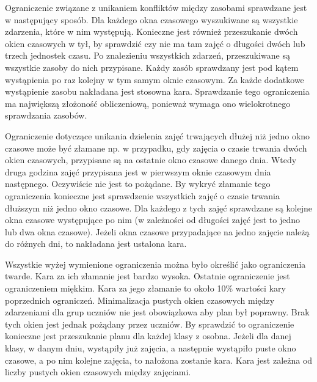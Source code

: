 Ograniczenie związane z unikaniem konfliktów między zasobami sprawdzane jest w następujący sposób. Dla każdego okna czasowego wyszukiwane są wszystkie zdarzenia, które w nim występują. Konieczne jest również przeszukanie dwóch okien czasowych w tył, by sprawdzić czy nie ma tam zajęć o długości dwóch lub trzech jednostek czasu. Po znalezieniu wszystkich zdarzeń, przeszukiwane są wszystkie zasoby do nich przypisane. Każdy zasób sprawdzany jest pod kątem wystąpienia po raz kolejny w tym samym oknie czasowym. Za każde dodatkowe wystąpienie zasobu nakładana jest stosowna kara. Sprawdzanie tego ograniczenia ma największą złożoność obliczeniową, ponieważ wymaga ono wielokrotnego sprawdzania zasobów.

Ograniczenie dotyczące unikania dzielenia zajęć trwających dłużej niż jedno okno czasowe może być złamane np. w przypadku, gdy zajęcia o czasie trwania dwóch okien czasowych, przypisane są na ostatnie okno czasowe danego dnia. Wtedy druga godzina zajęć przypisana jest w pierwszym oknie czasowym dnia następnego. Oczywiście nie jest to pożądane. By wykryć złamanie tego ograniczenia konieczne jest sprawdzenie wszystkich zajęć o czasie trwania dłuższym niż jedno okno czasowe. Dla każdego z tych zajęć sprawdzane są kolejne okna czasowe występujące po nim (w zależności od długości zajęć jest to jedno lub dwa okna czasowe). Jeżeli okna czasowe przypadające na jedno zajęcie należą do różnych dni, to nakładana jest ustalona kara.

Wszystkie wyżej wymienione ograniczenia można było określić jako ograniczenia twarde. Kara za ich złamanie jest bardzo wysoka. Ostatnie ograniczenie jest ograniczeniem miękkim. Kara za jego złamanie to około 10\% wartości kary poprzednich ograniczeń. Minimalizacja pustych okien czasowych między zdarzeniami dla grup uczniów nie jest obowiązkowa aby plan był poprawny. Brak tych okien jest jednak pożądany przez uczniów. By sprawdzić to ograniczenie konieczne jest przeszukanie planu dla każdej klasy z osobna. Jeżeli dla danej klasy, w danym dniu, wystąpiły już zajęcia, a następnie wystąpiło puste okno czasowe, a po nim kolejne zajęcia, to nałożona zostanie kara. Kara jest zależna od liczby pustych okien czasowych między zajęciami.